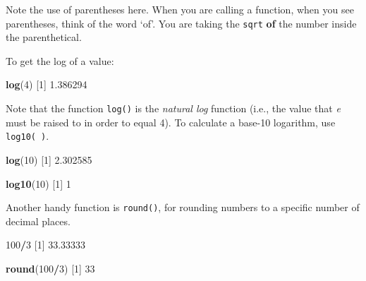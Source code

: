 \documentclass[]{book}
\newenvironment{Shaded}{\begin{snugshade}}{\end{snugshade}}
\newcommand{\DecValTok}[1]{\textcolor[rgb]{0.00,0.00,0.81}{#1}}
\newcommand{\FloatTok}[1]{\textcolor[rgb]{0.00,0.00,0.81}{#1}}
\newcommand{\KeywordTok}[1]{\textcolor[rgb]{0.13,0.29,0.53}{\textbf{#1}}}
\newcommand{\NormalTok}[1]{#1}
\newcommand{\OperatorTok}[1]{\textcolor[rgb]{0.81,0.36,0.00}{\textbf{#1}}}
\begin{document}
Note the use of parentheses here. When you are calling a function, when you see parentheses, think of the word `of'. You are taking the \texttt{sqrt} \textbf{of} the number inside the parenthetical.

To get the log of a value:

\begin{Shaded}
\begin{Highlighting}[]
\KeywordTok{log}\NormalTok{(}\DecValTok{4}\NormalTok{)}
\NormalTok{[}\DecValTok{1}\NormalTok{] }\FloatTok{1.386294}
\end{Highlighting}
\end{Shaded}

Note that the function \texttt{log()} is the \emph{natural log} function (i.e., the value that \emph{e} must be raised to in order to equal 4). To calculate a base-10 logarithm, use \texttt{log10(\ )}.

\begin{Shaded}
\begin{Highlighting}[]
\KeywordTok{log}\NormalTok{(}\DecValTok{10}\NormalTok{)}
\NormalTok{[}\DecValTok{1}\NormalTok{] }\FloatTok{2.302585}
\end{Highlighting}
\end{Shaded}

\begin{Shaded}
\begin{Highlighting}[]
\KeywordTok{log10}\NormalTok{(}\DecValTok{10}\NormalTok{)}
\NormalTok{[}\DecValTok{1}\NormalTok{] }\DecValTok{1}
\end{Highlighting}
\end{Shaded}

Another handy function is \texttt{round()}, for rounding numbers to a specific number of decimal places.

\begin{Shaded}
\begin{Highlighting}[]
\DecValTok{100}\OperatorTok{/}\DecValTok{3}
\NormalTok{[}\DecValTok{1}\NormalTok{] }\FloatTok{33.33333}
\end{Highlighting}
\end{Shaded}

\begin{Shaded}
\begin{Highlighting}[]
\KeywordTok{round}\NormalTok{(}\DecValTok{100}\OperatorTok{/}\DecValTok{3}\NormalTok{)}
\NormalTok{[}\DecValTok{1}\NormalTok{] }\DecValTok{33}
\end{Highlighting}
\end{Shaded}
\end{document}
